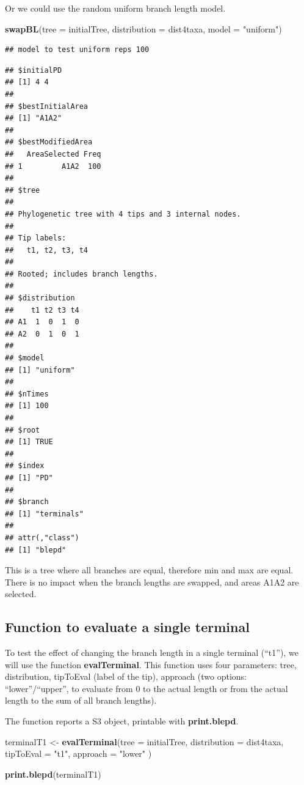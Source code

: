 \documentclass[]{article}
\newenvironment{Shaded}{\begin{snugshade}}{\end{snugshade}}
\newcommand{\DataTypeTok}[1]{\textcolor[rgb]{0.13,0.29,0.53}{#1}}
\newcommand{\KeywordTok}[1]{\textcolor[rgb]{0.13,0.29,0.53}{\textbf{#1}}}
\newcommand{\NormalTok}[1]{#1}
\newcommand{\StringTok}[1]{\textcolor[rgb]{0.31,0.60,0.02}{#1}}
\begin{document}
Or we could use the random uniform branch length model.

\begin{Shaded}
\begin{Highlighting}[]
\KeywordTok{swapBL}\NormalTok{(}\DataTypeTok{tree =}\NormalTok{ initialTree,}
       \DataTypeTok{distribution =}\NormalTok{ dist4taxa,}
       \DataTypeTok{model =} \StringTok{"uniform"}\NormalTok{)}
\end{Highlighting}
\end{Shaded}

\begin{verbatim}
## model to test uniform reps 100
\end{verbatim}

\begin{verbatim}
## $initialPD
## [1] 4 4
## 
## $bestInitialArea
## [1] "A1A2"
## 
## $bestModifiedArea
##   AreaSelected Freq
## 1         A1A2  100
## 
## $tree
## 
## Phylogenetic tree with 4 tips and 3 internal nodes.
## 
## Tip labels:
##   t1, t2, t3, t4
## 
## Rooted; includes branch lengths.
## 
## $distribution
##    t1 t2 t3 t4
## A1  1  0  1  0
## A2  0  1  0  1
## 
## $model
## [1] "uniform"
## 
## $nTimes
## [1] 100
## 
## $root
## [1] TRUE
## 
## $index
## [1] "PD"
## 
## $branch
## [1] "terminals"
## 
## attr(,"class")
## [1] "blepd"
\end{verbatim}

This is a tree where all branches are equal, therefore min and max are
equal. There is no impact when the branch lengths are swapped, and areas
A1A2 are selected.

\hypertarget{function-to-evaluate-a-single-terminal}{%
\subsection{Function to evaluate a single
terminal}\label{function-to-evaluate-a-single-terminal}}

To test the effect of changing the branch length in a single terminal
(``t1''), we will use the function \textbf{evalTerminal}. This function
uses four parameters: tree, distribution, tipToEval (label of the tip),
approach (two options: ``lower''/``upper'', to evaluate from 0 to the
actual length or from the actual length to the sum of all branch
lengths).

The function reports a S3 object, printable with \textbf{print.blepd}.

\begin{Shaded}
\begin{Highlighting}[]
\NormalTok{terminalT1 <-}\StringTok{ }\KeywordTok{evalTerminal}\NormalTok{(}\DataTypeTok{tree =}\NormalTok{ initialTree,}
             \DataTypeTok{distribution =}\NormalTok{ dist4taxa,}
             \DataTypeTok{tipToEval =} \StringTok{"t1"}\NormalTok{,}
             \DataTypeTok{approach =} \StringTok{"lower"}\NormalTok{ )}

\KeywordTok{print.blepd}\NormalTok{(terminalT1)}
\end{Highlighting}
\end{Shaded}
\end{document}
